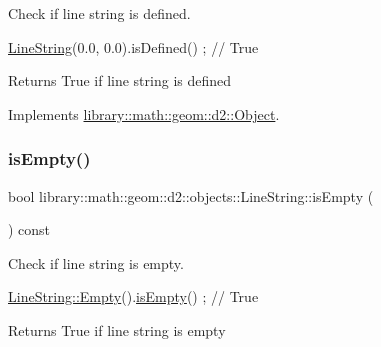 Check if line string is defined. 


\begin{DoxyCode}
\hyperlink{classlibrary_1_1math_1_1geom_1_1d2_1_1objects_1_1_line_string_aa313a076051c7fb722b9eeb6d5bf2f7e}{LineString}(0.0, 0.0).isDefined() ; \textcolor{comment}{// True}
\end{DoxyCode}


\begin{DoxyReturn}{Returns}
True if line string is defined 
\end{DoxyReturn}


Implements \hyperlink{classlibrary_1_1math_1_1geom_1_1d2_1_1_object_ae9506254971168a3ca63e1923556b70d}{library\+::math\+::geom\+::d2\+::\+Object}.

\mbox{\label{classlibrary_1_1math_1_1geom_1_1d2_1_1objects_1_1_line_string_a4cdb4e69cd076285cb14356b86b41fcf}} 
\subsubsection{\texorpdfstring{is\+Empty()}{isEmpty()}}
{\footnotesize\ttfamily bool library\+::math\+::geom\+::d2\+::objects\+::\+Line\+String\+::is\+Empty (\begin{DoxyParamCaption}{ }\end{DoxyParamCaption}) const}



Check if line string is empty. 


\begin{DoxyCode}
\hyperlink{classlibrary_1_1math_1_1geom_1_1d2_1_1objects_1_1_line_string_af8a783642dc4ba67d4e0ca2140cda343}{LineString::Empty}().\hyperlink{classlibrary_1_1math_1_1geom_1_1d2_1_1objects_1_1_line_string_a4cdb4e69cd076285cb14356b86b41fcf}{isEmpty}() ; \textcolor{comment}{// True}
\end{DoxyCode}


\begin{DoxyReturn}{Returns}
True if line string is empty 
\end{DoxyReturn}
\mbox{\label{classlibrary_1_1math_1_1geom_1_1d2_1_1objects_1_1_line_string_a306598a5dca56802f094c57465a4d551}} 

